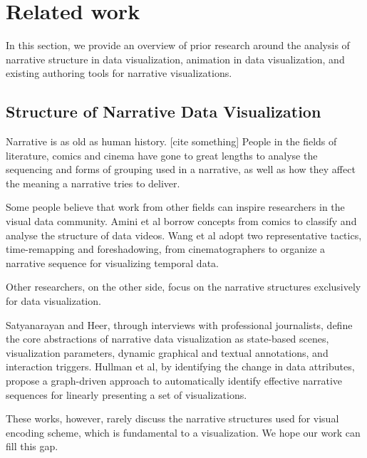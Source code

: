 \section {Related work}
In this section, we provide an overview of prior research around the analysis of narrative structure in data visualization, animation in data visualization, and existing authoring tools for narrative visualizations.\par
\subsection{Structure of Narrative Data Visualization}
Narrative is as old as human history. [cite something] People in the fields of literature, comics \cite{cohn_visual_2013} and cinema \cite{schmidt_living_2017} have gone to great lengths to analyse the sequencing and forms of grouping used in a narrative, as well as how they affect the meaning a narrative tries to deliver. \par
Some people believe that work from other fields can inspire researchers in the visual data community. Amini et al\cite{amini_understanding_2015} borrow concepts from comics \cite{cohn_visual_2013} to classify and analyse the structure of data videos. Wang et al \cite{wang_animated_2016} adopt two representative tactics, time-remapping and foreshadowing, from cinematographers to organize a narrative sequence for visualizing temporal data. \par
Other researchers, on the other side, focus on the narrative structures exclusively for data visualization. \par
Satyanarayan and Heer, through interviews with professional journalists\cite{satyanarayan_authoring_2014}, define the core abstractions of narrative data visualization as state-based scenes, visualization parameters, dynamic graphical and textual annotations, and interaction triggers. Hullman et al\cite{hullman_deeper_2013}, by identifying the change in data attributes, propose a graph-driven approach to automatically identify effective narrative sequences for linearly presenting a set of visualizations. \par
These works, however, rarely discuss the narrative structures used for visual encoding scheme, which is fundamental to a visualization. We hope our work can fill this gap.\par
